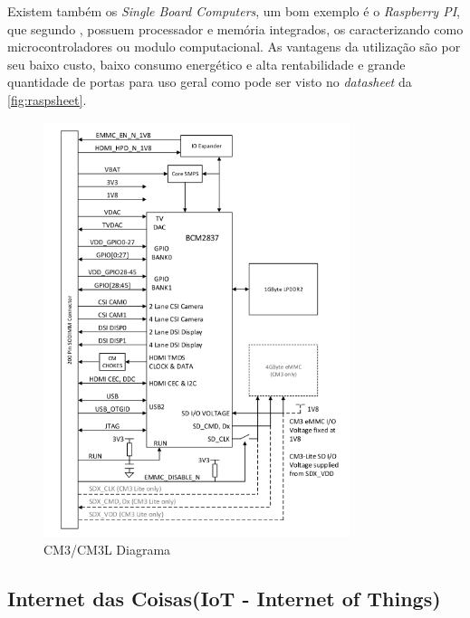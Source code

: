 Existem também os \textit{Single Board Computers}, um bom exemplo é o \textit{Raspberry PI}, que segundo , possuem processador e memória integrados, os caracterizando como microcontroladores ou modulo computacional. As vantagens da utilização são por seu baixo custo, baixo consumo energético e alta rentabilidade e grande quantidade de portas para uso geral como pode ser visto no \textit{datasheet} da \autoref{fig:raspsheet}.
 \begin{figure}[H]
	\centering
    	\caption{\label{fig:raspsheet} CM3/CM3L Diagrama }
		\includegraphics[width = 0.8\textwidth]	{resources/raspsheet}
\end{figure}




\subsection{Internet das Coisas(IoT - Internet of Things)}

